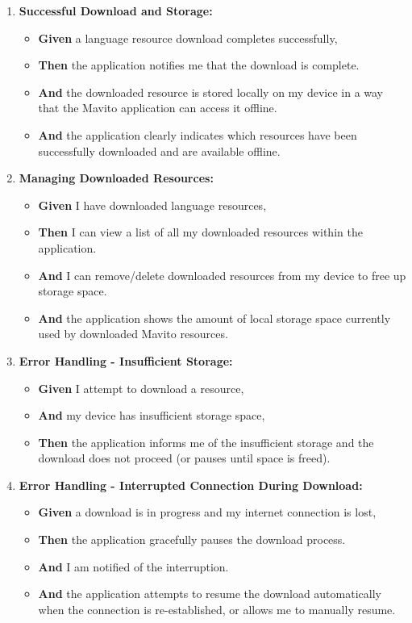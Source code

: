 \documentclass[12pt]{article}
\begin{document}
\begin{enumerate}
    \item \textbf{Successful Download and Storage:}
    \begin{itemize}
        \item \textbf{Given} a language resource download completes successfully,
        \item \textbf{Then} the application notifies me that the download is complete.
        \item \textbf{And} the downloaded resource is stored locally on my device in a way that the Mavito application can access it offline.
        \item \textbf{And} the application clearly indicates which resources have been successfully downloaded and are available offline.
    \end{itemize}

    \item \textbf{Managing Downloaded Resources:}
    \begin{itemize}
        \item \textbf{Given} I have downloaded language resources,
        \item \textbf{Then} I can view a list of all my downloaded resources within the application.
        \item \textbf{And} I can remove/delete downloaded resources from my device to free up storage space.
        \item \textbf{And} the application shows the amount of local storage space currently used by downloaded Mavito resources.
    \end{itemize}

    \item \textbf{Error Handling - Insufficient Storage:}
    \begin{itemize}
        \item \textbf{Given} I attempt to download a resource,
        \item \textbf{And} my device has insufficient storage space,
        \item \textbf{Then} the application informs me of the insufficient storage and the download does not proceed (or pauses until space is freed).
    \end{itemize}

    \item \textbf{Error Handling - Interrupted Connection During Download:}
    \begin{itemize}
        \item \textbf{Given} a download is in progress and my internet connection is lost,
        \item \textbf{Then} the application gracefully pauses the download process.
        \item \textbf{And} I am notified of the interruption.
        \item \textbf{And} the application attempts to resume the download automatically when the connection is re-established, or allows me to manually resume.
    \end{itemize}


\end{enumerate}
\end{document}
